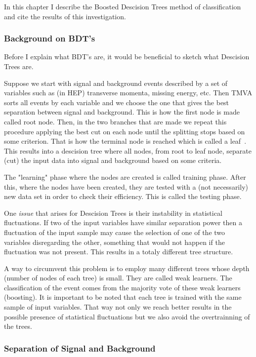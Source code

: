 \documentclass[12pt,a4paper]{report}
\begin{document}
In this chapter I describe the Boosted Descision Trees method of classification and cite the results of this 
investigation.

\subsubsection{Background on BDT's}

Before I explain what BDT's are, it would be beneficial to sketch what Descision Trees are. 

Suppose we start with signal and background events described by a set of variables such as (in HEP) transverse 
momenta, missing energy, etc. Then TMVA sorts all events by each variable and we choose the one that gives the
best separation between signal and background. This is how the first node is made called root node. 
Then, in the two branches 
that are made we repeat this procedure applying the best cut on each node until the splitting stops based on 
some criterion. That is how the terminal node is reached which is called a leaf~\cite{hoecker2007tmva}.
This results into a descision tree where all nodes, from root to leaf node, separate (cut) the input
data into signal and background based on some criteria.

The "learning" phase where the nodes are created is called training phase. After this, where the 
nodes have been created, they are tested with a (not necessarily) new  data set in order to 
check their efficiency. This is called the testing phase.

One \textit{issue} that arises for Descision Trees is their instability in statistical fluctuations. If two 
of the input variables have similar separation power then a fluctuation of the input sample may cause the 
selection of one of the two variables disregarding the other, something that would not happen if the fluctuation
was not present. This results in a totaly different tree structure.

A way to circumvent this problem is to employ many different trees whose depth (number of nodes
of each tree) is small. 
They are called
weak learners. The classification of the event comes from the majority vote of these weak learners (boosting).
It is important to be noted that each tree is trained with the same sample of input variables. That way not 
only we reach better results in the possible presence of statistical fluctuations but we also avoid the 
overtrainning of the trees.

\subsubsection{Separation of Signal and Background}
\end{document}
